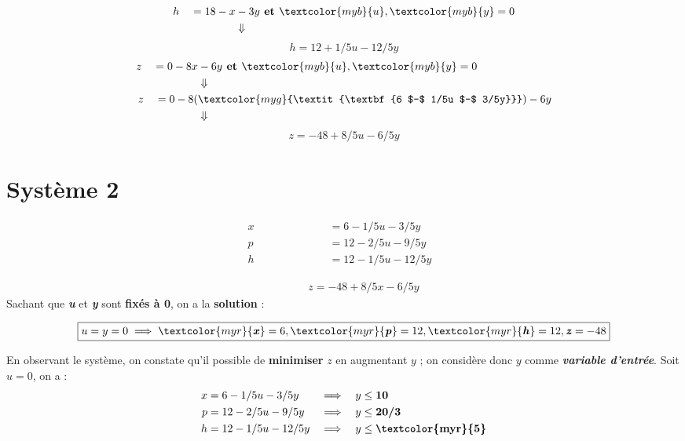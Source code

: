 \documentclass{report}
\newcommand{\Pointilles}[1]{%
  \par\nobreak
  \noindent\rule{0pt}{1.5\baselineskip}%
  \multido{}{#1}{\noindent\makebox[\linewidth]{\dotfill}\endgraf}%
  \bigskip%
}
\begin{document}
\begin{multicols*}{3}
\begin{align*}
    h \quad = 18 - x &- 3y
    \textbf{ et } \textcolor{myb}{u}, \textcolor{myb}{y} = 0 
    \\
                     &\Downarrow
\end{align*}
      \[%
    \boxed{h = 12 +1/5u -12/5y}
      \]%
\begin{align*}
    z \quad = 0 - 8x &- 6y
    \textbf{ et } \textcolor{myb}{u}, \textcolor{myb}{y} = 0 
    \\
                     &\Downarrow
    \\
    z \quad = 0 - 8(&\textcolor{myg}{\textit{\textbf{6 $-$ 1/5u $-$ 3/5y}}})
 - 6y
    \\ 
                    &\Downarrow
\end{align*}
      \[%
    \boxed{z = -48 +8/5u -6/5y}
      \]%

\section{Système 2}
\begin{align*}
    x \quad\quad\quad\quad\quad\quad &= 6 - 1/5u -3/5y& \\
    p \quad\quad\quad\quad  &= 12 -2/5u -9/5y& \\
    h \quad\quad &= 12 - 1/5u -12/5y&
\end{align*}
\vspace{-2.5em}    
\Pointilles{1}
\vspace{-2.5em}
\begin{align*}
    \quad\quad\quad\;\; z = -48 +8/5x -6/5y
\end{align*}
Sachant que 
\textcolor{myb}{\textbf{\textit{u}}} et 
\textcolor{myb}{\textbf{\textit{y}}}  sont \textbf{fixés à 0}, 
on a la \textbf{solution} : 

\begin{align*}
\boxed{u = y = 0 \implies 
\textcolor{myr}{\textbf{\textit{x}}}  = 6, 
\textcolor{myr}{\textbf{\textit{p}}} = 12,
\textcolor{myr}{\textbf{\textit{h}}} = 12,
\textbf{\textit{z}} = -48}
\end{align*}

En observant le système, on constate qu'il possible de 
\textbf{minimiser} $z$ en augmentant $y$ ; on considère 
donc $y$ comme \textcolor{myb}{\textbf{\textit{variable d'entrée}}}. Soit 
$u = 0$, on a :
\begin{align*}
    x &= 6 - 1/5u -3/5y& 
    \implies \quad 
    & y \leq \textbf{10}  
    \\
    p &= 12 - 2/5u -9/5y 
      & \implies \quad  &  y \leq \textbf{20/3}
    \\
    h &= 12 - 1/5u -12/5y&
    \implies \quad & y \leq \textbf{\textcolor{myr}{5}} 
\end{align*}


\end{multicols*}
\end{document}
